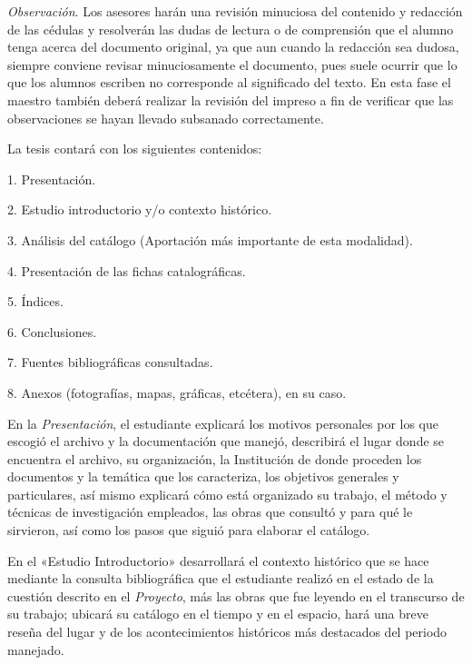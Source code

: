 \smallskip
\noindent \textsl{Observación}. Los asesores harán una 
revisión minuciosa del contenido y redacción de las cédulas y 
resolverán las dudas de lectura o de comprensión que el alumno tenga 
acerca del documento original, ya que aun cuando la redacción sea 
dudosa, siempre conviene revisar minuciosamente el documento, pues 
suele ocurrir que lo que los alumnos escriben no corresponde al 
significado del texto. En esta fase el maestro también deberá realizar 
la revisión del impreso a fin de verificar que las observaciones se 
hayan llevado subsanado correctamente. 

La tesis contará con los siguientes contenidos:
\begin{Obs}
 \item[1.] Presentación. 
 \item[2.] Estudio introductorio y\slash{}o contexto histórico. 
 \item[3.] Análisis del catálogo (Aportación más importante de esta modalidad). 
 \item[4.] Presentación de las fichas catalográficas. 
 \item[5.] Índices. 
 \item[6.] Conclusiones.
 \item[7.] Fuentes bibliográficas consultadas. 
 \item[8.] Anexos (fotografías, mapas, gráficas, etcétera), en su caso. 
\end{Obs}

\enlargethispage{1\baselineskip}
\noindent En la \textit{Presentación}, el estudiante explicará los 
motivos personales por los que escogió el archivo y la documentación 
que manejó, describirá el lugar donde se encuentra el archivo, su 
organización, la Institución de donde proceden los documentos y la 
temática que los caracteriza, los objetivos generales y particulares, 
así mismo explicará cómo está organizado su trabajo, el método y 
técnicas de investigación empleados, las obras que consultó y para qué 
le sirvieron, así como  los pasos que siguió para elaborar el catálogo.

En el «Estudio Introductorio» desarrollará el contexto histórico que se 
hace mediante la consulta bibliográfica que el estudiante realizó en el 
estado de la cuestión descrito en el \textit{Proyecto}, más las obras 
que fue leyendo en el transcurso de su trabajo; ubicará su catálogo en 
el tiempo y en el espacio, hará una breve reseña del lugar y de los 
acontecimientos históricos más destacados del periodo manejado.

